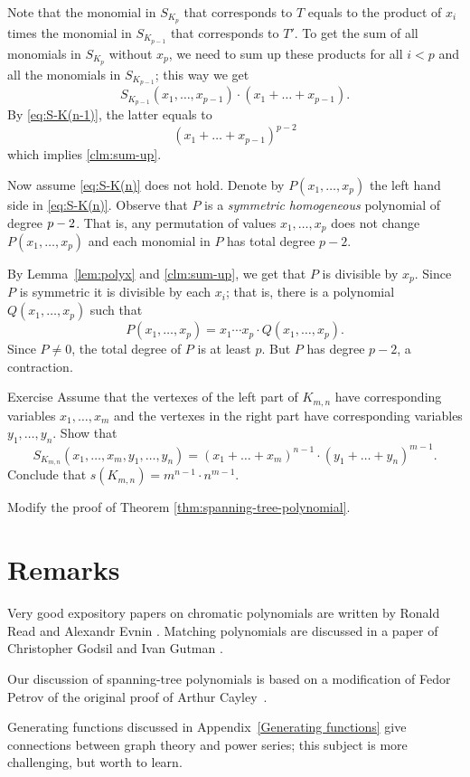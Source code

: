 Note that the monomial in $S_{K_p}$ that corresponds to $T$ equals 
to the product of $x_i$ times the monomial in $S_{K_{p-1}}$
that corresponds to $T'$.
To get the sum of all monomials in $S_{K_p}$ without $x_p$, we need to sum up these products for all $i<p$ and all the monomials in $S_{K_{p-1}}$; this way we get 
\[S_{K_{p-1}}(x_1,\dots,x_{p-1})\cdot(x_1+\dots+x_{p-1}).\]
By \ref{eq:S-K(n-1)}, the latter equals to
\[(x_1+\dots+x_{p-1})^{p-2}\]
which implies \ref{clm:sum-up}.

Now assume \ref{eq:S-K(n)} does not hold.
Denote by $P(x_1,\dots,x_p)$ the left hand side in \ref{eq:S-K(n)}.
Observe that $P$ is a {}\emph{symmetric} {}\emph{homogeneous} polynomial of degree $p\z-2$.
That is, any permutation of values $x_1,\dots, x_p$ does not change $P(x_1,\dots,x_p)$ and each monomial in $P$ has total degree $p-2$.

By Lemma~\ref{lem:polyx} and \ref{clm:sum-up}, we get that $P$ is divisible by $x_p$.
Since $P$ is symmetric it is divisible by each $x_i$;
that is, there is a polynomial $Q(x_1,\dots,x_p)$ such that 
\[P(x_1,\dots,x_p)=x_1\cdots x_p\cdot Q(x_1,\dots,x_p).\]
Since $P\ne 0$, the total degree of $P$ is at least $p$.
But $P$ has degree $p-2$, a contraction.
\qeds

\begin{thm}{Exercise}
Assume that the vertexes of the left part of $K_{m,n}$ have corresponding variables $x_1,\dots,x_m$ and the vertexes in the right part have corresponding variables $y_1,\dots,y_n$. 
Show that
\[S_{K_{m,n}}(x_1,\dots,x_m,y_1,\dots,y_n)=(x_1+\dots +x_m)^{n-1}\cdot(y_1+\dots +y_n)^{m-1}.\]
Conclude that $s(K_{m,n})=m^{n-1}\cdot n^{m-1}$.

\end{thm}

 Modify the proof of Theorem \ref{thm:spanning-tree-polynomial}.

\section*{Remarks}

Very good expository papers on chromatic polynomials are written by
Ronald Read \cite{read} and Alexandr Evnin \cite{evnin-chnom}. 
Matching polynomials are discussed in a paper of Christopher Godsil and Ivan Gutman \cite{godsil-gutman}.

Our discussion of spanning-tree polynomials is based on a modification of Fedor Petrov \cite{petrov} of the original proof of Arthur Cayley~\cite{cayley}. 

Generating functions discussed in Appendix~\ref{Generating functions} give connections between graph theory and power series; this subject is more challenging, but worth to learn.   
